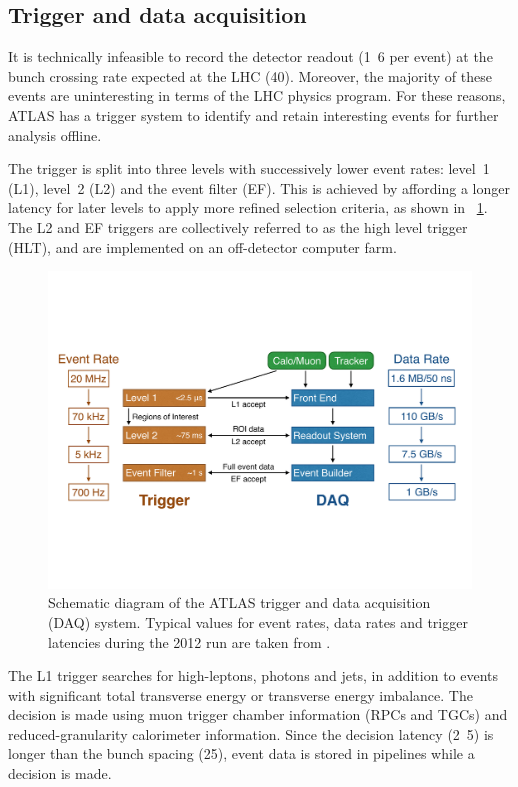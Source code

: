 \subsection{Trigger and data acquisition}
\label{sec:atlas:trig}

It is technically infeasible to record the detector readout (\unit{1.6}{\mega\bel} per 
event) at the bunch crossing rate expected at the LHC (\unit{40}{\mega\hertz}).
Moreover, the majority of these events are uninteresting in terms of the LHC physics 
program. For these reasons, ATLAS has a trigger system to identify and retain interesting
events for further analysis offline.

The trigger is split into three levels with successively lower event rates: level~1 (L1), 
level~2 (L2) and the event filter (EF). This is achieved by affording a longer latency 
for later levels to apply more refined selection criteria, as shown in 
\Figure~\ref{fig:trigger}. The L2 and EF triggers are collectively referred to as the 
high level trigger (HLT), and are implemented on an off-detector computer farm.

\begin{figure}
	\includegraphics[width=\textwidth,clip=true,trim=0.9cm 6.8cm 1.4cm 6.8cm]{custom_images/trigger}
	\caption{Schematic diagram of the ATLAS trigger and data acquisition (DAQ) system.
	Typical values for event rates, data rates and trigger latencies during the 2012 run 
	are taken from \cite{TriggerNumbers}.}
	\label{fig:trigger}
\end{figure}

The L1 trigger searches for high-\pt leptons, photons and jets, in addition to 
events with significant total transverse energy or transverse energy imbalance. The 
decision is made using muon trigger chamber information (RPCs and TGCs) and 
reduced-granularity calorimeter information. Since the decision latency 
(\unit{2.5}{\micro\second}) is longer than the bunch spacing (\unit{25}{\nano\second}),
event data is stored in pipelines while a decision is made.

